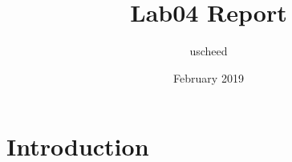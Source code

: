 \documentclass{article}
\title{Lab04 Report}
\author{uscheed }
\date{February 2019}
\begin{document}
\maketitle

\section{Introduction}


\end{document}
